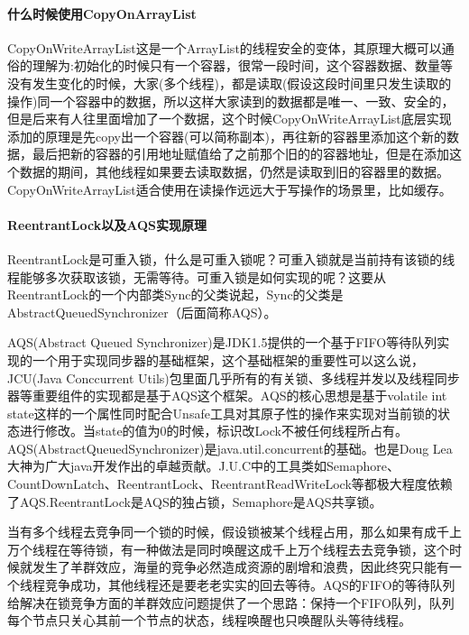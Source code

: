 \documentclass[../../../interview-questions.tex]{subfiles}
\begin{document}
\paragraph{什么时候使用CopyOnArrayList}

CopyOnWriteArrayList这是一个ArrayList的线程安全的变体，其原理大概可以通俗的理解为:初始化的时候只有一个容器，很常一段时间，这个容器数据、数量等没有发生变化的时候，大家(多个线程)，都是读取(假设这段时间里只发生读取的操作)同一个容器中的数据，所以这样大家读到的数据都是唯一、一致、安全的，但是后来有人往里面增加了一个数据，这个时候CopyOnWriteArrayList底层实现添加的原理是先copy出一个容器(可以简称副本)，再往新的容器里添加这个新的数据，最后把新的容器的引用地址赋值给了之前那个旧的的容器地址，但是在添加这个数据的期间，其他线程如果要去读取数据，仍然是读取到旧的容器里的数据。CopyOnWriteArrayList适合使用在读操作远远大于写操作的场景里，比如缓存。

\paragraph{ReentrantLock以及AQS实现原理}

ReentrantLock是可重入锁，什么是可重入锁呢？可重入锁就是当前持有该锁的线程能够多次获取该锁，无需等待。可重入锁是如何实现的呢？这要从ReentrantLock的一个内部类Sync的父类说起，Sync的父类是AbstractQueuedSynchronizer（后面简称AQS）。

AQS(Abstract Queued Synchronizer)是JDK1.5提供的一个基于FIFO等待队列实现的一个用于实现同步器的基础框架，这个基础框架的重要性可以这么说，JCU(Java Conccurrent Utils)包里面几乎所有的有关锁、多线程并发以及线程同步器等重要组件的实现都是基于AQS这个框架。AQS的核心思想是基于volatile int state这样的一个属性同时配合Unsafe工具对其原子性的操作来实现对当前锁的状态进行修改。当state的值为0的时候，标识改Lock不被任何线程所占有。AQS(AbstractQueuedSynchronizer)是java.util.concurrent的基础。也是Doug Lea大神为广大java开发作出的卓越贡献。J.U.C中的工具类如Semaphore、CountDownLatch、ReentrantLock、ReentrantReadWriteLock等都极大程度依赖了AQS.ReentrantLock是AQS的独占锁，Semaphore是AQS共享锁。

当有多个线程去竞争同一个锁的时候，假设锁被某个线程占用，那么如果有成千上万个线程在等待锁，有一种做法是同时唤醒这成千上万个线程去去竞争锁，这个时候就发生了羊群效应，海量的竞争必然造成资源的剧增和浪费，因此终究只能有一个线程竞争成功，其他线程还是要老老实实的回去等待。AQS的FIFO的等待队列给解决在锁竞争方面的羊群效应问题提供了一个思路：保持一个FIFO队列，队列每个节点只关心其前一个节点的状态，线程唤醒也只唤醒队头等待线程。
\end{document}
